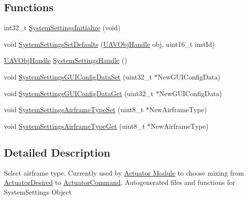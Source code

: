 \subsection*{\-Functions}
\begin{DoxyCompactItemize}
\item 
int32\-\_\-t \hyperlink{group___system_settings_ga9a1d9c07d6385d1e543148638f478420}{\-System\-Settings\-Initialize} (void)
\item 
void \hyperlink{group___system_settings_ga2b0a62ab00a794bd18a4a84558494f14}{\-System\-Settings\-Set\-Defaults} (\hyperlink{targets_2_u_a_v_objects_2inc_2uavobjectmanager_8h_a279053e22be53ce9f895043aaeb91e3b}{\-U\-A\-V\-Obj\-Handle} obj, uint16\-\_\-t inst\-Id)
\item 
\hyperlink{targets_2_u_a_v_objects_2inc_2uavobjectmanager_8h_a279053e22be53ce9f895043aaeb91e3b}{\-U\-A\-V\-Obj\-Handle} \hyperlink{group___system_settings_ga910cbd76a0a0b67b0a7ba8beb965fb89}{\-System\-Settings\-Handle} ()
\item 
void \hyperlink{group___system_settings_gac0ff360f8159b436a8114c93a3a126ac}{\-System\-Settings\-G\-U\-I\-Config\-Data\-Set} (uint32\-\_\-t $\ast$\-New\-G\-U\-I\-Config\-Data)
\item 
void \hyperlink{group___system_settings_ga4a1dade7442c2c1c6f6b5dfca8099a97}{\-System\-Settings\-G\-U\-I\-Config\-Data\-Get} (uint32\-\_\-t $\ast$\-New\-G\-U\-I\-Config\-Data)
\item 
void \hyperlink{group___system_settings_ga42c59a489f426d615499d14ab0773566}{\-System\-Settings\-Airframe\-Type\-Set} (uint8\-\_\-t $\ast$\-New\-Airframe\-Type)
\item 
void \hyperlink{group___system_settings_ga6d998412dfe2528b8c6e00166ecf7e94}{\-System\-Settings\-Airframe\-Type\-Get} (uint8\-\_\-t $\ast$\-New\-Airframe\-Type)
\end{DoxyCompactItemize}


\subsection{\-Detailed \-Description}
\-Select airframe type. \-Currently used by \hyperlink{group___actuator_module}{\-Actuator \-Module} to choose mixing from \hyperlink{group___actuator_desired}{\-Actuator\-Desired} to \hyperlink{group___actuator_command}{\-Actuator\-Command}. \-Autogenerated files and functions for \-System\-Settings \-Object 

